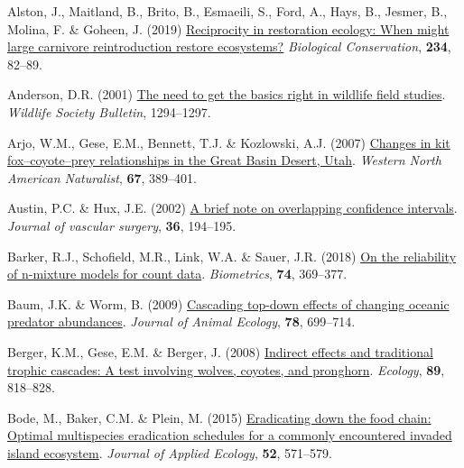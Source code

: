 \documentclass[preprint, 3p, authoryear]{elsarticle} %
\newlength{\cslhangindent}
\newlength{\cslentryspacingunit} %
\newenvironment{CSLReferences}[2] %
 {%
  \setlength{\parindent}{0pt}
  \ifodd #1
  \let\oldpar\par
  \def\par{\hangindent=\cslhangindent\oldpar}
  \fi
  \setlength{\parskip}{#2\cslentryspacingunit}
 }%
 {}
\begin{document}
\hypertarget{refs}{}
\begin{CSLReferences}{1}{0}
\leavevmode{}%
Alston, J., Maitland, B., Brito, B., Esmaeili, S., Ford, A., Hays, B., Jesmer, B., Molina, F. \& Goheen, J. (2019) \href{https://doi.org/10.1016/j.biocon.2019.03.021}{Reciprocity in restoration ecology: When might large carnivore reintroduction restore ecosystems?} \emph{Biological Conservation}, \textbf{234}, 82--89.

\leavevmode{}%
Anderson, D.R. (2001) \href{https://doi.org/10.2307/3784156}{The need to get the basics right in wildlife field studies}. \emph{Wildlife Society Bulletin}, 1294--1297.

\leavevmode{}%
Arjo, W.M., Gese, E.M., Bennett, T.J. \& Kozlowski, A.J. (2007) \href{https://doi.org/10.3398/1527-0904(2007)67\%5B389:CIKFRI\%5D2.0.CO;2}{{Changes in kit fox--coyote--prey relationships in the Great Basin Desert, Utah}}. \emph{Western North American Naturalist}, \textbf{67}, 389--401.

\leavevmode{}%
Austin, P.C. \& Hux, J.E. (2002) \href{https://doi.org/10.1067/mva.2002.125015}{A brief note on overlapping confidence intervals}. \emph{Journal of vascular surgery}, \textbf{36}, 194--195.

\leavevmode{}%
Barker, R.J., Schofield, M.R., Link, W.A. \& Sauer, J.R. (2018) \href{https://doi.org/10.1111/biom.12734}{On the reliability of n-mixture models for count data}. \emph{Biometrics}, \textbf{74}, 369--377.

\leavevmode{}%
Baum, J.K. \& Worm, B. (2009) \href{https://doi.org/10.1111/j.1365-2656.2009.01531.x}{Cascading top-down effects of changing oceanic predator abundances}. \emph{Journal of Animal Ecology}, \textbf{78}, 699--714.

\leavevmode{}%
Berger, K.M., Gese, E.M. \& Berger, J. (2008) \href{https://doi.org/10.1890/07-0193.1}{Indirect effects and traditional trophic cascades: A test involving wolves, coyotes, and pronghorn}. \emph{Ecology}, \textbf{89}, 818--828.

\leavevmode{}%
Bode, M., Baker, C.M. \& Plein, M. (2015) \href{https://doi.org/10.1111/1365-2664.12429}{Eradicating down the food chain: Optimal multispecies eradication schedules for a commonly encountered invaded island ecosystem}. \emph{Journal of Applied Ecology}, \textbf{52}, 571--579.


\end{CSLReferences}
\end{document}
